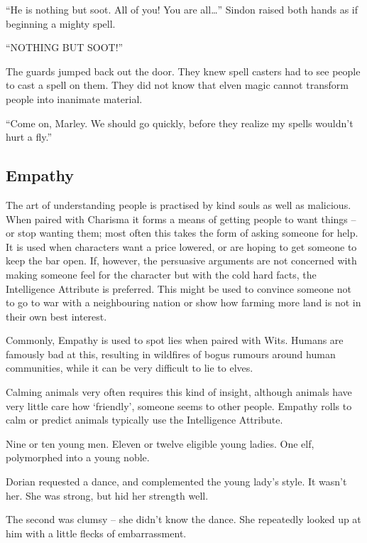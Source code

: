 \begin{multicols}{2}
\begin{exampletext}
  ``He is nothing but soot.
  All of you!
  You are all\ldots''
  Sindon raised both hands as if beginning a mighty spell.

  ``NOTHING BUT SOOT!''

  The guards jumped back out the door.
  They knew spell casters had to see people to cast a spell on them.
  They did not know that elven magic cannot transform people into inanimate material.

  ``Come on, Marley.
  We should go quickly, before they realize my spells wouldn't hurt a fly.''

\end{exampletext}

\subsection{Empathy}

The art of understanding people is practised by kind souls as well as malicious.
When paired with Charisma it forms a means of getting people to want things -- or stop wanting them; most often this takes the form of asking someone for help.
It is used when characters want a price lowered, or are hoping to get someone to keep the bar open.
If, however, the persuasive arguments are not concerned with making someone feel for the character but with the cold hard facts, the Intelligence Attribute is preferred.
This might be used to convince someone not to go to war with a neighbouring nation or show how farming more land is not in their own best interest.

Commonly, Empathy is used to spot lies when paired with Wits.
Humans are famously bad at this, resulting in wildfires of bogus rumours around human communities, while it can be very difficult to lie to elves.

Calming animals very often requires this kind of insight, although animals have very little care how `friendly', someone seems to other people.
Empathy rolls to calm or predict animals typically use the Intelligence Attribute.

\begin{exampletext}
  Nine or ten young men.
  Eleven or twelve eligible young ladies.
  One elf, polymorphed into a young noble.

  Dorian requested a dance, and complemented the young lady's style.
  It wasn't her.
  She was strong, but hid her strength well.

  The second was clumsy -- she didn't know the dance.
  She repeatedly looked up at him with a little flecks of embarrassment.


\end{exampletext}
\end{multicols}

